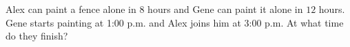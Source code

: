 Alex can paint a fence alone in $8$ hours and Gene can paint it alone in $12$ hours. Gene starts painting at 1:00 p.m. and Alex joins him at 3:00 p.m. At what time do they finish?
